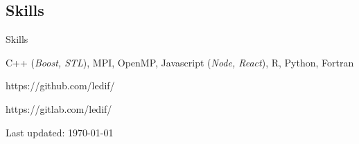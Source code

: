 \documentclass[a4paper,10pt,oneside]{article}
\begin{document}
\begin{body}



\section{Skills}
{Skills}

C++ (\emph{Boost, STL}), MPI, OpenMP, Javascript (\emph{Node, React}), R, Python, Fortran
\par
\EntryGap
https://github.com/ledif/
\par
\EntryGap
https://gitlab.com/ledif/





\EntryGap
\EntryGap
\EntryGap

  \begin{small}
    Last updated: \today
  \end{small}


\end{body}
\end{document}

